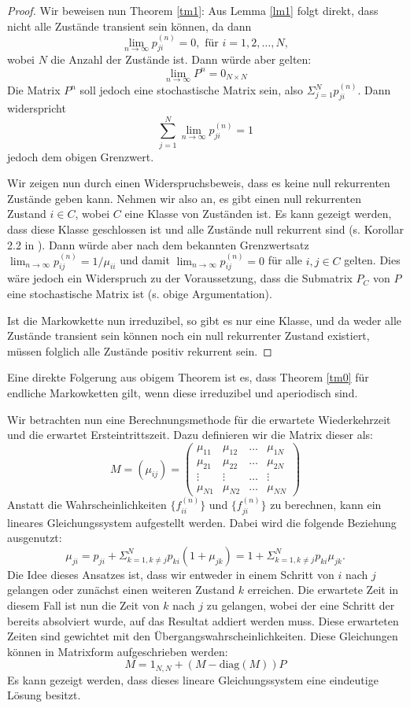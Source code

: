 \documentclass{article}
\begin{document}
\begin{proof}
  Wir beweisen nun Theorem \ref{tm1}:
  Aus Lemma \ref{lm1} folgt direkt, dass nicht alle Zustände transient
  sein können, da dann
\[
  \lim_{n→∞} p_{ji}^{(n)} = 0, \text{ für } i = 1,2,\dots,N,
\]
wobei $N$ die Anzahl der Zustände ist. Dann würde aber gelten:
\[
  \lim_{n→∞} P^n = 0_{N×N}
\]
Die Matrix $P^n$ soll jedoch eine stochastische Matrix sein, also
$Σ_{j=1}^Np_{ji}^{(n)}$. Dann widerspricht
\[
  \sum_{j=1}^N \lim_{n→∞}
  p_{ji}^{(n)} = 1
\]
jedoch dem obigen Grenzwert.

Wir zeigen nun durch einen Widerspruchsbeweis, dass es keine null rekurrenten Zustände geben kann.
Nehmen wir also an, es gibt einen null rekurrenten Zustand $i∈C$, wobei $C$ eine Klasse von Zuständen ist. Es kann gezeigt werden, dass diese Klasse geschlossen ist und alle Zustände null rekurrent sind (s. Korollar 2.2 in \cite{allen}). Dann würde aber nach dem bekannten Grenzwertsatz $\lim_{n→∞} p_{ij}^{(n)} = 1 / μ_{ii}$ und damit $\lim_{n→∞} p_{ij}^{(n)} = 0$ für alle $i,j ∈ C$ gelten. Dies wäre jedoch ein Widerspruch zu der Voraussetzung, dass die Submatrix $P_C$ von $P$ eine stochastische Matrix ist (s{.} obige Argumentation).

Ist die Markowkette nun irreduzibel, so gibt es nur eine Klasse, und da weder alle Zustände transient sein können noch ein null rekurrenter Zustand existiert, müssen folglich alle Zustände positiv rekurrent sein. 
\end{proof}
Eine direkte Folgerung aus obigem Theorem ist es, dass Theorem \ref{tm0}
für endliche Markowketten gilt, wenn diese irreduzibel und
aperiodisch sind.

Wir betrachten nun eine Berechnungsmethode für die erwartete Wiederkehrzeit und die erwartet Ersteintrittszeit. Dazu definieren wir die Matrix dieser als:
\[
  M = (μ_{ij}) = \begin{pmatrix}
    μ_{11} & μ_{12} & \dots & μ_{1N} \\
    μ_{21} & μ_{22} & \dots & μ_{2N} \\
    \vdots & \vdots & \dots & \vdots \\
    μ_{N1} & μ_{N2} & \dots & μ_{NN}
  \end{pmatrix}
\]
Anstatt die Wahrscheinlichkeiten $\{f_{ii}^{(n)}\}$ und $\{f_{ji}^{(n)}\}$ zu berechnen, kann ein lineares Gleichungssystem aufgestellt werden. Dabei wird die folgende Beziehung ausgenutzt:
\[
  μ_{ji} = p_{ji} + Σ_{k=1,k≠j}^Np_{ki}(1+μ_{jk}) = 1+Σ_{k=1,k≠j}^Np_{ki}μ_{jk}.
\]
Die Idee dieses Ansatzes ist, dass wir entweder in einem Schritt von $i$ nach $j$ gelangen oder zunächst einen weiteren Zustand $k$ erreichen. Die erwartete Zeit in diesem Fall ist nun die Zeit von $k$ nach $j$ zu gelangen, wobei der eine Schritt der bereits absolviert wurde, auf das Resultat addiert werden muss. Diese erwarteten Zeiten sind gewichtet mit den Übergangswahrscheinlichkeiten. Diese Gleichungen können in Matrixform aufgeschrieben werden:
\[
  M = 1_{N,N} + (M - \text{diag}(M))P
\]
Es kann gezeigt werden, dass dieses lineare Gleichungssystem eine eindeutige Lösung besitzt.
\end{document}
